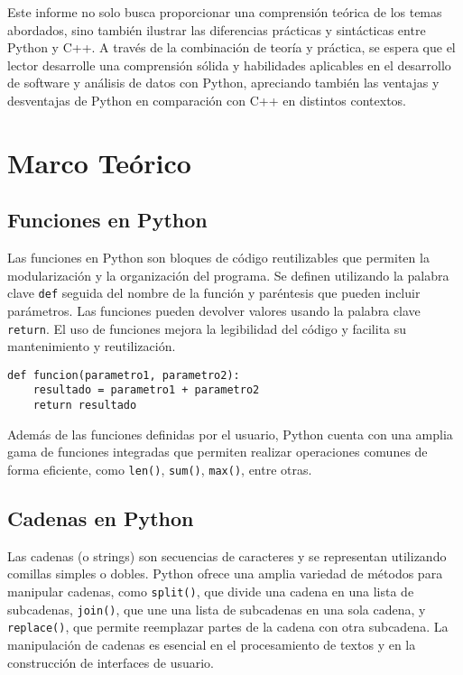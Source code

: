 \documentclass[conference]{IEEEtran}
\begin{document}
Este informe no solo busca proporcionar una comprensión teórica de los temas abordados, sino también ilustrar las diferencias prácticas y sintácticas entre Python y C++. A través de la combinación de teoría y práctica, se espera que el lector desarrolle una comprensión sólida y habilidades aplicables en el desarrollo de software y análisis de datos con Python, apreciando también las ventajas y desventajas de Python en comparación con C++ en distintos contextos.




\section{Marco Teórico}



    \subsection{Funciones en Python}
Las funciones en Python son bloques de código reutilizables que permiten la modularización y la organización del programa. Se definen utilizando la palabra clave \texttt{def} seguida del nombre de la función y paréntesis que pueden incluir parámetros. Las funciones pueden devolver valores usando la palabra clave \texttt{return}. El uso de funciones mejora la legibilidad del código y facilita su mantenimiento y reutilización.

\begin{verbatim}
def funcion(parametro1, parametro2):
    resultado = parametro1 + parametro2
    return resultado
\end{verbatim}

Además de las funciones definidas por el usuario, Python cuenta con una amplia gama de funciones integradas que permiten realizar operaciones comunes de forma eficiente, como \texttt{len()}, \texttt{sum()}, \texttt{max()}, entre otras.

    \subsection{Cadenas en Python}
Las cadenas (o strings) son secuencias de caracteres y se representan utilizando comillas simples o dobles. Python ofrece una amplia variedad de métodos para manipular cadenas, como \texttt{split()}, que divide una cadena en una lista de subcadenas, \texttt{join()}, que une una lista de subcadenas en una sola cadena, y \texttt{replace()}, que permite reemplazar partes de la cadena con otra subcadena. La manipulación de cadenas es esencial en el procesamiento de textos y en la construcción de interfaces de usuario.
\end{document}

